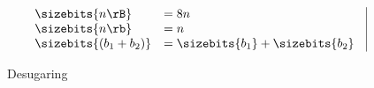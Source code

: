 \begin{figure}
\begin{displaymath}
\begin{array}{l|l}
    \begin{array}{ll}
      \sizebits{n\rB} & = 8n \\
      \sizebits{n\rb} & = n  \\
      \sizebits{(b_1 + b_2)} & = \sizebits{b_1} + \sizebits{b_2}
    \end{array}
  \end{array}
  \end{displaymath}
  \caption{Desugaring \Dargent}
  \label{fig:dargent-desugar}
\end{figure}


